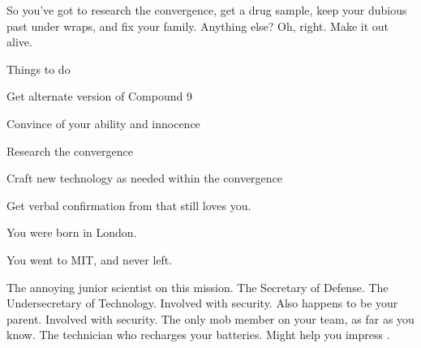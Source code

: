 \documentclass[char]{guildcamp3}
\begin{document}
So you've got to research the convergence, get a drug sample, keep your dubious past under wraps, and fix your family. Anything else? Oh, right. Make it out alive.

\begin{itemz}[Goals]
  \item Things to do
  \item Get alternate version of Compound 9
  \item Convince \cScientistOne of your ability and innocence
  \item Research the convergence
  \item Craft new technology as needed within the convergence
  \item Get verbal confirmation from \cSpecialOpsOne that \cSpecialOpsOne{\they} still loves you.
\end{itemz}

\begin{itemz}[Notes]
  \item You were born in London.
  \item You went to MIT, and never left.
\end{itemz}


\begin{contacts}
  \contact{\cScientistTwo{}} The annoying junior scientist on this mission.
  \contact{\cPoliticianOne{}} The Secretary of Defense.
  \contact{\cPoliticianTwo{}} The Undersecretary of Technology.
   \contact{\cSpecOpsOne{}} Involved with security. Also happens to be your parent.
   \contact{\cSpecOpsTwo{}} Involved with security. The only mob member on your team, as far as you know.
    \contact{\cTechnician{}} The technician who recharges your batteries. Might help you impress \cSciTwo.
\end{contacts}



  \mTest{}


\end{document}
